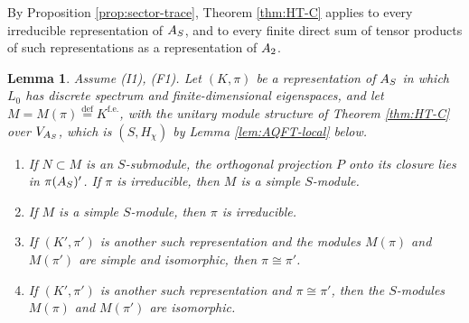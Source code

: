 \documentclass[leqno]{article}
\let\cal\relax
\newcommand{\cal}{\mathcal}
\newcommand{\ov}{\overset}
\newtheorem{lemma}[thm]{Lemma}
\numberwithin{equation}{section}
\begin{document}
By Proposition \ref{prop:sector-trace}, Theorem \ref{thm:HT-C} applies to every irreducible representation of $\cal A_S$, and to every finite direct sum of tensor products of such representations as a representation of $\cal A_2$.

\begin{lemma}
\label{lem:HT-irreducible}
Assume \textup{(I1)}, \textup{(F1)}. Let $(K,\pi)$ be a representation of $\cal A_S$ in which $L_0$ has discrete spectrum and finite-dimensional eigenspaces, and let $M = M(\pi) \ov{\mathrm{def}}{=} K^{\mathrm{f.e.}}$, with the unitary module structure of Theorem \ref{thm:HT-C} over $V_{\cal A_S}$, which is $(S,H_\chi)$ by Lemma \ref{lem:AQFT-local} below.
\begin{enumerate}
\item If $N \subset M$ is an $S$-submodule, the orthogonal projection $P$ onto its closure lies in $\pi(\cal A_S)'$. If $\pi$ is irreducible, then $M$ is a simple $S$-module.
\item If $M$ is a simple $S$-module, then $\pi$ is irreducible.
\item If $(K',\pi')$ is another such representation and the modules $M(\pi)$ and $M(\pi')$ are simple and isomorphic, then $\pi \cong \pi'$.
\item If $(K',\pi')$ is another such representation and $\pi \cong \pi'$, then the $S$-modules $M(\pi)$ and $M(\pi')$ are isomorphic.
\end{enumerate}
\end{lemma}
\end{document}
